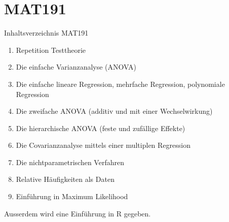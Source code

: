 \documentclass[handout]{beamer}
\begin{document}
\appendix
\section*{MAT191}
\begin{frame}{Inhaltsverzeichnis MAT191}
\begin{enumerate}
\item Repetition Testtheorie
\item Die einfache Varianzanalyse (ANOVA)
\item Die einfache lineare Regression, mehrfache Regression, polynomiale Regression
\item Die zweifache ANOVA (additiv und mit einer Wechselwirkung)
\item Die hierarchische ANOVA (feste und zufällige Effekte)
\item Die Covarianzanalyse mittels einer multiplen Regression
\item Die nichtparametrischen Verfahren
\item Relative Häufigkeiten als Daten
\item Einführung in Maximum Likelihood
\end{enumerate}
Ausserdem wird eine Einführung in R gegeben.
\end{frame}
\end{document}
